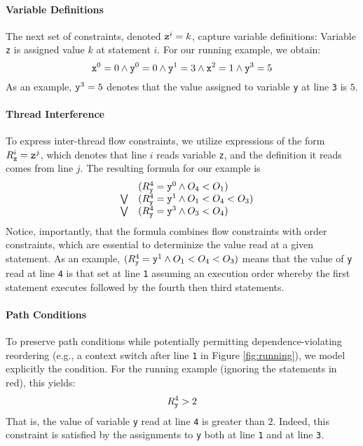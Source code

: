 \paragraph{Variable Definitions} The next set of constraints, denoted ${\tt z}^i=k$, capture variable definitions: Variable {\tt z} is assigned value $k$ at statement $i$. For our running example, we obtain:
$$
	{\tt x}^0 = 0 \wedge {\tt y}^0 = 0 \wedge {\tt y}^1 = 3 \wedge 
			{\tt x}^2 = 1 \wedge {\tt y}^3 = 5
$$
As an example, ${\tt y}^3 = 5$ denotes that the value assigned to variable {\tt y} 
at line {\tt 3} is $5$.

\paragraph{Thread Interference} To express inter-thread flow constraints, we utilize expressions of the form $R_{\tt z}^i={\tt z}^j$, which denotes that line $i$ reads variable {\tt z}, and the definition it reads comes from line $j$. The resulting formula for our example is
$$
\begin{array}{lcl}
	& & (R_{\tt y}^4={\tt y}^0 \wedge O_4 < O_1)  \\
& \bigvee &
	(R_{\tt y}^4={\tt y}^1 \wedge O_1 < O_4 < O_3) \\
& \bigvee &
	(R_{\tt y}^4={\tt y}^3 \wedge O_3 < O_4)
\end{array}
$$    
Notice, importantly, that the formula combines flow constraints with order constraints, which are essential to determinize the value read at a given statement. As an example, 
$(R_{\tt y}^4={\tt y}^1 \wedge O_1 < O_4 < O_3)$ means that the value of {\tt y} read at 
line {\tt 4} is that set at line {\tt 1} assuming an execution order whereby the first statement executes followed by the fourth then third statements. 

\paragraph{Path Conditions} To preserve path conditions while potentially permitting dependence-violating reordering (e.g., a context switch after line {\tt 1} in Figure \ref{fig:running}), we model explicitly the condition. For the running example (ignoring the statements in red), this yields:
$$
	R_{\tt y}^4 > 2
$$
That is, the value of variable {\tt y} read at line {\tt 4} is greater than $2$. Indeed, this constraint is satisfied by the assignments to {\tt y} both at line {\tt 1} and at line {\tt 3}.

